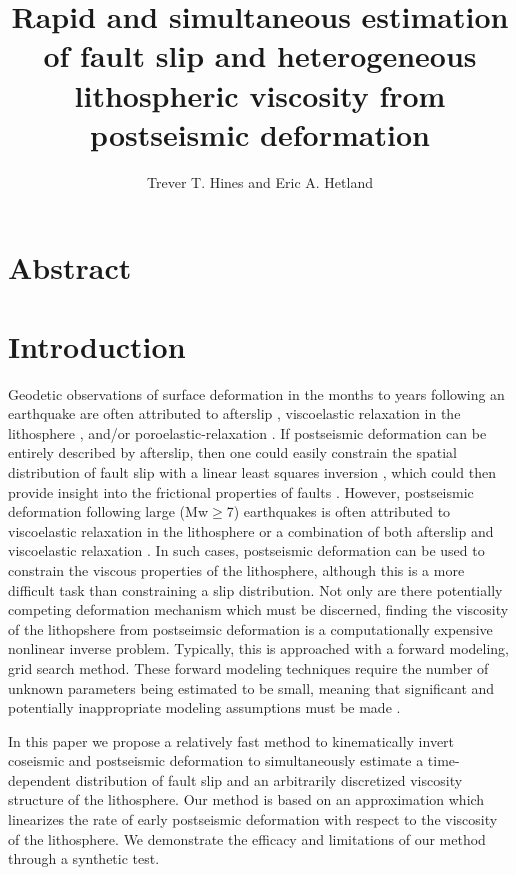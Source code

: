 \documentclass[fleqn,12pt]{article}
\begin{document}
\title{Rapid and simultaneous estimation of fault slip and
  heterogeneous lithospheric viscosity from postseismic deformation}
\author{Trever T. Hines and Eric A. Hetland} \maketitle
\section{Abstract}

\section{Introduction}
Geodetic observations of surface deformation in the months to years
following an earthquake are often attributed to afterslip
\citep[e.g.][]{M1991}, viscoelastic relaxation in the lithosphere
\citep[e.g.][]{NM1974}, and/or poroelastic-relaxation
\citep[e.g.][]{P1998,J2003}.  If postseismic deformation can be
entirely described by afterslip, then one could easily constrain the
spatial distribution of fault slip with a linear least squares
inversion \citep[e.g.][]{F2007,B2002,H1987}, which could then provide
insight into the frictional properties of faults
\citep[e.g.][]{H2006,B2009}.  However, postseismic deformation following
large (Mw$\geq$7) earthquakes is often attributed to viscoelastic
relaxation in the lithosphere \citep[e.g.][]{P2003,P2005,HH2003} or a
combination of both afterslip and viscoelastic relaxation
\citep[e.g.][]{J2009,F2006,H2008,R2015}.  In such cases, postseismic deformation
can be used to constrain the viscous properties of the lithosphere,
although this is a more difficult task than constraining a slip
distribution.  Not only are there potentially competing deformation
mechanism which must be discerned, finding the viscosity of
the lithopshere from postseimsic deformation is a computationally
expensive nonlinear inverse problem.  Typically, this is approached
with a forward modeling, grid search method.  These forward modeling
techniques require the number of unknown parameters being estimated to
be small, meaning that significant and potentially inappropriate
modeling assumptions must be made \citep{H2013,RG2008}.

In this paper we propose a relatively fast method to kinematically
invert coseismic and postseismic deformation to simultaneously
estimate a time-dependent distribution of fault slip and an
arbitrarily discretized viscosity structure of the lithosphere.  Our
method is based on an approximation which linearizes the rate of early
postseismic deformation with respect to the viscosity of the
lithosphere.  We demonstrate the efficacy and limitations of our
method through a synthetic test.
\end{document}
